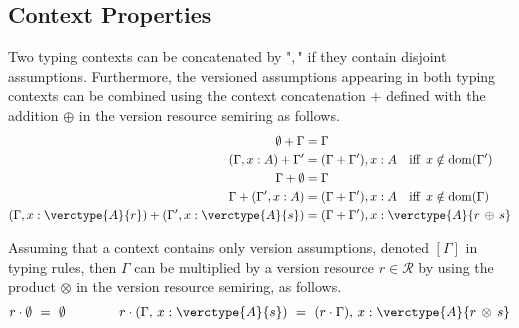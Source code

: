 




\subsection{Context Properties}
\begin{definition}
\label{def:contextconcat}
Two typing contexts can be concatenated by "$,$" if they contain disjoint assumptions. 
Furthermore, the versioned assumptions appearing in both typing contexts can be combined using the context concatenation $+$ defined with the addition $\oplus$ in the version resource semiring as follows.
\begin{align*}
\emptyset + \Gamma &= \Gamma\\
(\Gamma,x:A)+\Gamma' &= (\Gamma + \Gamma'),x:A \hspace{1em} \text{iff}\hspace{0.5em} x \notin \mathrm{dom}(\Gamma')\\
\Gamma + \emptyset &= \Gamma\\
\Gamma+(\Gamma',x:A) &= (\Gamma + \Gamma'),x:A \hspace{1em} \text{iff}\hspace{0.5em} x \notin \mathrm{dom}(\Gamma)\\
(\Gamma,x:\verctype{A}{r})+(\Gamma',x:\verctype{A}{s}) &= (\Gamma + \Gamma'),x:\verctype{A}{r \,\oplus\, s}
\end{align*}
\end{definition}

\begin{definition}
\label{def:multiply}
Assuming that a context contains only version assumptions, denoted $[\Gamma]$ in typing rules, then $\Gamma$ can be multiplied by a version resource $r \in \mathcal{R}$ by using the product $\otimes$ in the version resource semiring, as follows.
\begin{align*}
r \cdot \emptyset\ =\ \emptyset \hspace{4em}
r \cdot (\Gamma,\, x:\verctype{A}{s})\ =\ (r \cdot \Gamma),\, x:\verctype{A}{r\,\otimes\, s}
\end{align*}    
\end{definition}

